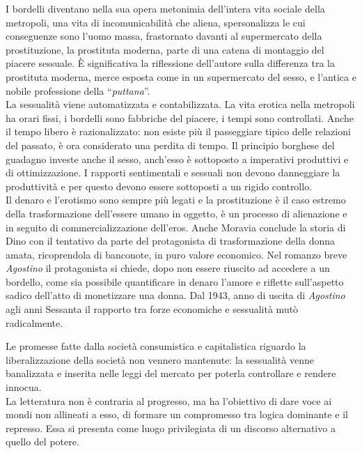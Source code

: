 I bordelli diventano nella sua opera metonimia dell'intera vita sociale della metropoli, una vita di incomunicabilità che aliena, spersonalizza le cui conseguenze sono l'uomo massa, frastornato davanti al supermercato della prostituzione, la prostituta moderna, parte di una catena di montaggio del piacere sessuale.
È significativa la riflessione dell'autore sulla differenza tra la prostituta moderna, merce esposta come in un supermercato del sesso, e l'antica  e nobile professione della \enquote{\textit{puttana}}.
\\La sessualità viene automatizzata e contabilizzata.
La vita erotica nella metropoli ha orari fissi, i bordelli sono fabbriche del piacere, i tempi sono controllati.
Anche il tempo libero è razionalizzato: non esiste più il passeggiare tipico delle relazioni del passato, è ora considerato una perdita di tempo. 
Il principio borghese del guadagno investe anche il sesso, anch'esso è sottoposto a imperativi produttivi e di ottimizzazione.
I rapporti sentimentali e sessuali non devono danneggiare la produttività e per questo devono essere sottoposti a un rigido controllo.
\\Il denaro e l'erotismo sono sempre più legati e la prostituzione è il caso estremo della trasformazione dell'essere umano in oggetto, è un processo di alienazione e in seguito di commercializzazione dell'eros.
Anche Moravia conclude la storia di Dino con il tentativo da parte del protagonista di trasformazione della donna amata, ricoprendola di banconote, in puro valore economico.
Nel romanzo breve \textit{Agostino} il protagonista si chiede, dopo non essere riuscito ad accedere a un bordello, come sia possibile quantificare in denaro l'amore e riflette sull'aspetto sadico dell'atto di monetizzare una donna.
Dal 1943, anno di uscita di \textit{Agostino} agli anni Sessanta il rapporto tra forze economiche e sessualità mutò radicalmente.

Le promesse fatte dalla società consumistica e capitalistica riguardo la liberalizzazione della società non vennero mantenute: la sessualità venne banalizzata e inserita nelle leggi del mercato per poterla controllare e rendere innocua.
\\La letteratura non è contraria al progresso, ma ha l'obiettivo di dare voce ai mondi non allineati a esso, di formare un compromesso tra logica dominante e il represso.
Essa si presenta come luogo privilegiata di un discorso alternativo a quello del potere.

